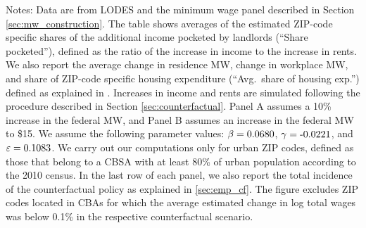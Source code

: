 \begin{table}[hbt!]
    \begin{minipage}{.95\textwidth} \footnotesize
        \vspace{2mm}
        Notes: 
        Data are from LODES and the minimum wage panel described in Section 
        \ref{sec:mw_construction}.
        The table shows averages of the estimated ZIP-code specific shares of the 
        additional income pocketed by landlords (``Share pocketed''), 
        defined as the ratio of the increase in income to the increase in rents.
        We also report the average 
        change in residence MW, change in workplace MW,
        and share of ZIP-code specific housing expenditure 
        (``Avg.\ share of housing exp.'') defined as explained in \label{sec:measure_housing_expenditure}.
        Increases in income and rents are simulated following the procedure 
        described in Section \ref{sec:counterfactual}.
        Panel A assumes a 10\% increase in the federal MW, and
        Panel B assumes an increase in the federal MW to \$15.
        We assume the following parameter values:
        $\beta = \textnormal{0.0680}$, $\gamma = \textnormal{-0.0221}$, and $\varepsilon = \textnormal{0.1083}$.
        We carry out our computations only for urban ZIP codes, defined as 
        those that belong to a CBSA with at least 80\% of urban population
        according to the 2010 census.
        In the last row of each panel, we also report the total incidence of the 
        counterfactual policy as explained in \ref{sec:emp_cf}.
        The figure excludes ZIP codes located in CBAs for which the average
        estimated change in log total wages was below 0.1\% in the respective
        counterfactual scenario.
    \end{minipage}
\end{table}
